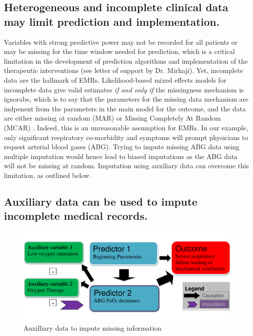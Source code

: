 \documentclass[11pt,notitlepage]{article}
\begin{document}
\subsection*{Heterogeneous and incomplete clinical data may limit prediction and implementation.}
Variables with strong predictive power may not be recorded for all patients 
or may be missing for the time window needed for prediction, which is a critical limitation 
in the development of prediction algorithms and implementation of the 
therapeutic interventions (see letter of support by Dr. Mirhaji). 
Yet, incomplete data are the hallmark of EMRs. 
Likelihood-based mixed effects models for incomplete data give valid estimates 
\textit{if and only if } the missingness mechanism is ignorabe, which is to say that the parameters 
for the missing data mechanism are indpenent from the parameters in the main model for the 
outcome, and the data are either missing at random (MAR) or Missing Completely At Random 
(MCAR) \cite{Rubin1976}. Indeed, this is an unreasonable assumption for EMRs. In our example, only 
significant respiratory co-morbidity and symptoms will prompt physicians to request arterial blood gases (ABG). Trying to 
impute missing ABG data using multiple imputation would  hence lead to biased 
imputations as the ABG data will not be missing at random. Imputation using 
auxiliary data can overcome this limitation, as outlined below.

\subsection*{Auxiliary data can be used to impute incomplete medical records.} 

\begin{figure} 
 \vspace{-25pt}
 \includegraphics[scale=0.4]{Figures/Bayesian_imputation.pdf}
    \vspace{-20pt}
  \caption{Auxilliary data to impute missing information}
   \vspace{-15pt}
   \label{fig:Imputation_fig}
\end{figure}
\end{document}
